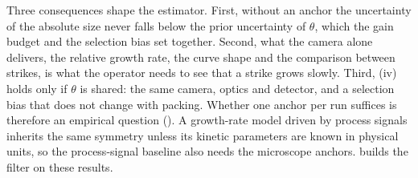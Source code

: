 Three consequences shape the estimator. First, without an anchor the uncertainty of the absolute size never falls
below the prior uncertainty of $\theta$, which the gain budget and the selection bias set together. Second, what the
camera alone delivers, the relative growth rate, the curve shape and the comparison between strikes, is what the
operator needs to see that a strike grows slowly. Third, (iv) holds only if $\theta$ is shared: the same camera,
optics and detector, and a selection bias that does not change with packing. Whether one anchor per run suffices is
therefore an empirical question (). A growth-rate model driven by process signals inherits the
same symmetry unless its kinetic parameters are known in physical units, so the process-signal baseline also needs the
microscope anchors.  builds the filter on these results.

